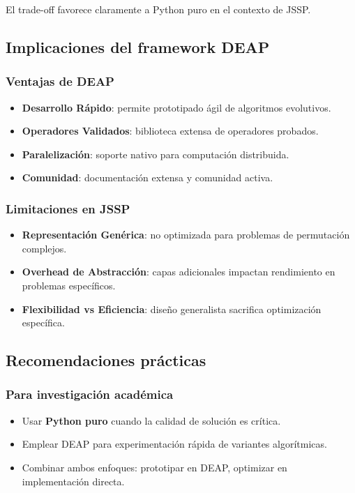 \documentclass[12pt,a4paper]{article}
\begin{document}
El trade-off favorece claramente a Python puro en el contexto de JSSP.

\subsection{Implicaciones del framework DEAP}

\subsubsection{Ventajas de DEAP}

\begin{itemize}
    \item \textbf{Desarrollo Rápido}: permite prototipado ágil de algoritmos evolutivos.
    \item \textbf{Operadores Validados}: biblioteca extensa de operadores probados.
    \item \textbf{Paralelización}: soporte nativo para computación distribuida.
    \item \textbf{Comunidad}: documentación extensa y comunidad activa.
\end{itemize}

\subsubsection{Limitaciones en JSSP}

\begin{itemize}
    \item \textbf{Representación Genérica}: no optimizada para problemas de permutación complejos.
    \item \textbf{Overhead de Abstracción}: capas adicionales impactan rendimiento en problemas específicos.
    \item \textbf{Flexibilidad vs Eficiencia}: diseño generalista sacrifica optimización específica.
\end{itemize}

\subsection{Recomendaciones prácticas}

\subsubsection{Para investigación académica}

\begin{itemize}
    \item Usar \textbf{Python puro} cuando la calidad de solución es crítica.
    \item Emplear DEAP para experimentación rápida de variantes algorítmicas.
    \item Combinar ambos enfoques: prototipar en DEAP, optimizar en implementación directa.
\end{itemize}
\end{document}
